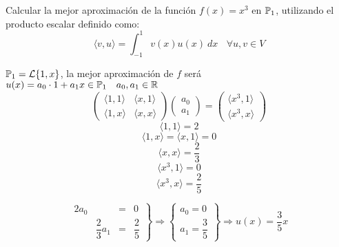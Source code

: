 \begin{ejemplo}
    Calcular la mejor aproximación de la función $f(x)=x^3$ en $\mathbb{P}_1$, utilizando el producto escalar definido como:
$$\langle v,u \rangle = \int_{-1}^1v(x)u(x)~dx~~~~\forall u,v \in V$$


\noindent
$\mathbb{P}_1 = \mathcal{L}\{1,x\}$, la mejor aproximación de $f$ será $u(x) = a_0 \cdot 1 + a_1x \in \mathbb{P}_1~~~a_0,a_1 \in \mathbb R$
$$\left( \begin{array}{cc}
            \langle 1,1 \rangle & \langle x,1 \rangle \\
            \langle 1,x \rangle & \langle x,x \rangle
        \end{array} \right) \left( \begin{array}{c}
            a_0 \\
            a_1
        \end{array} \right) = \left( \begin{array}{c}
            \langle x^3,1 \rangle \\
            \langle x^3,x \rangle
        \end{array} \right)$$
$$\langle 1,1 \rangle = 2$$
$$\langle 1,x \rangle = \langle x,1 \rangle = 0$$
$$\langle x,x \rangle = \dfrac{2}{3} $$
$$\langle x^3,1 \rangle = 0$$
$$\langle x^3,x \rangle = \dfrac{2}{5}$$

$$\left. \begin{array}{cccc}
        2a_0 &                 & = & 0            \\
             & \dfrac{2}{3}a_1 & = & \dfrac{2}{5}
    \end{array} \right\} \Rightarrow \left\{ \begin{array}{c}
        a_0 = 0 \\
        a_1 = \dfrac{3}{5}
    \end{array} \right\} \Rightarrow u(x) = \dfrac{3}{5}x$$
\end{ejemplo}



